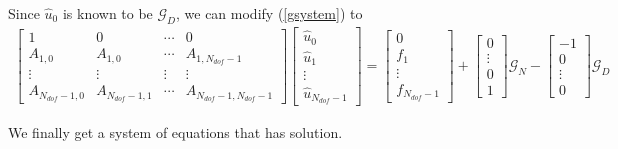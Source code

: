 Since $\hat u_0$ is known to be $\mathcal{G}_D$, we can modify
(\ref{gsystem}) to
\begin{eqnarray}
\label{g2system}
\begin{bmatrix}
    1               & 0         &\cdots     & 0   \\
    A_{1,0}         & A_{1,0}   &\cdots     & A_{1,N_{dof}-1}   \\
    \vdots          &\vdots     &\vdots     &\vdots        \\
    A_{N_{dof}-1,0} & A_{N_{dof}-1,1} &\cdots     & A_{N_{dof}-1,N_{dof}-1}
\end{bmatrix}
\begin{bmatrix}
    \hat u_0    \\
    \hat u_1    \\
    \vdots      \\
    \hat u_{N_{dof}-1}
\end{bmatrix}
=
\begin{bmatrix}
    0       \\
    f_1     \\
    \vdots  \\
    f_{N_{dof}-1}
\end{bmatrix}
+
\begin{bmatrix}
    0       \\
    \vdots  \\
    0       \\
    1
\end{bmatrix}
\mathcal{G}_N
-
\begin{bmatrix}
    -1       \\
    0       \\
    \vdots  \\
    0
\end{bmatrix}
\mathcal{G}_D
\end{eqnarray}

We finally get a system of equations that has solution.

